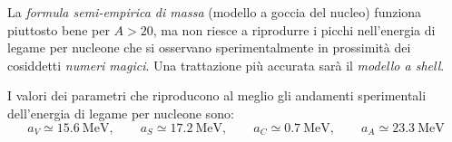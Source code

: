 \begin{note}[]
  La \textit{formula semi-empirica di massa} (modello a goccia del nucleo)
  funziona piuttosto bene per $A > 20$, ma non riesce a riprodurre i picchi
  nell'energia di legame per nucleone che si osservano sperimentalmente in
  prossimità dei cosiddetti \textit{numeri magici}.
  Una trattazione più accurata sarà il \textit{modello a shell}.
\end{note}

\begin{note}[]
  I valori dei parametri che riproducono al meglio gli andamenti sperimentali
  dell'energia di legame per nucleone sono:
  \begin{equation}
    a_V \simeq \qty{15.6}{\MeV},
    \qquad
    a_S \simeq \qty{17.2}{\MeV},
    \qquad
    a_C \simeq \qty{0.7}{\MeV},
    \qquad
    a_A \simeq \qty{23.3}{\MeV}
  \end{equation}
\end{note}
